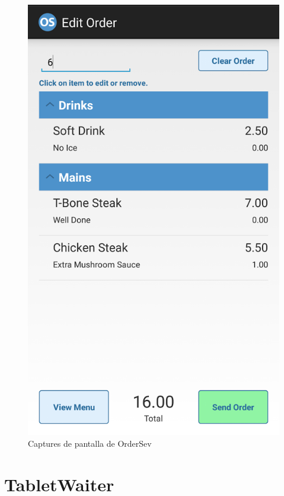 \begin{figure}[H]
\includegraphics[scale=0.20]{Figures/ordersev-3.png}
\caption{Captures de pantalla de OrderSev}
\end{figure}


\section{TabletWaiter}

